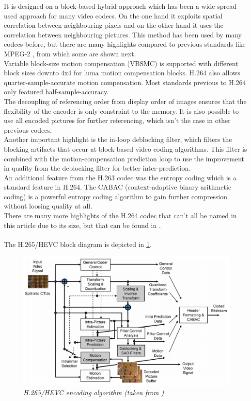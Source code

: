 It is designed on a block-based hybrid approach which has been a wide spread used approach for many video codecs. On the one hand it exploits spatial correlation between neighbouring pixels and on the other hand it uses the correlation between neighbouring pictures. This method has been used by many codecs before, but there are many highlights compared to previous standards like MPEG-2 \cite{MPEG2}, from which some are shown next.\\
Variable block-size motion compensation (VBSMC) is supported with different block sizes downto 4x4 for luma motion compensation blocks. H.264 also allows quarter-sample-accurate motion compensation. Most standards previous to H.264 only featured half-sample-accuracy.\\ The decoupling of referencing order from display order of images ensures that the flexibility of the encoder is only constraint to the memory. It is also possible to use all encoded pictures for further referencing, which isn't the case in other previous codecs.\\
Another important highlight is the in-loop deblocking filter, which filters the blocking artifacts that occur at block-based video coding algorithms. This filter is combined with the motion-compensation prediction loop to use the improvement in quality from the deblocking filter for better inter-prediction.\\
An additional feature from the H.263 codec was the entropy coding which is a standard feature in H.264. The CABAC (context-adaptive binary arithmetic coding) \cite{cabac} is a powerful entropy coding algorithm to gain further compression without loosing quality at all.\\
There are many more highlights of the H.264 codec that can't all be named in this article due to its size, but that can be found in \cite{H264_Overview}.\\
\\


The H.265/HEVC \cite{H265_Overview} block diagram is depicted in \ref{h265}. 


\begin{figure}[ht]
\centerline{\includegraphics[scale=0.45]{pics/H265_Blockschaltbild}} %
\caption{\label{h265}{\it H.265/HEVC encoding algorithm (taken from \cite{H265_Overview})}}
\end{figure} %


